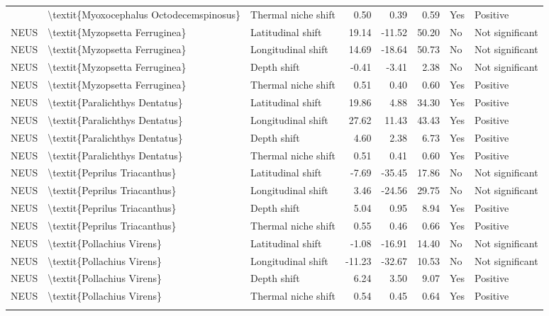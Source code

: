 \begin{longtable}[t]{lllrrrll}
{{\addlinespace
NEUS & \textbackslash{}textit\{Myoxocephalus Octodecemspinosus\} & Thermal niche shift & 0.50 & 0.39 & 0.59 & Yes & Positive\\
NEUS & \textbackslash{}textit\{Myzopsetta Ferruginea\} & Latitudinal shift & 19.14 & -11.52 & 50.20 & No & Not significant\\
NEUS & \textbackslash{}textit\{Myzopsetta Ferruginea\} & Longitudinal shift & 14.69 & -18.64 & 50.73 & No & Not significant\\
NEUS & \textbackslash{}textit\{Myzopsetta Ferruginea\} & Depth shift & -0.41 & -3.41 & 2.38 & No & Not significant\\
NEUS & \textbackslash{}textit\{Myzopsetta Ferruginea\} & Thermal niche shift & 0.51 & 0.40 & 0.60 & Yes & Positive\\
\addlinespace
NEUS & \textbackslash{}textit\{Paralichthys Dentatus\} & Latitudinal shift & 19.86 & 4.88 & 34.30 & Yes & Positive\\
NEUS & \textbackslash{}textit\{Paralichthys Dentatus\} & Longitudinal shift & 27.62 & 11.43 & 43.43 & Yes & Positive\\
NEUS & \textbackslash{}textit\{Paralichthys Dentatus\} & Depth shift & 4.60 & 2.38 & 6.73 & Yes & Positive\\
NEUS & \textbackslash{}textit\{Paralichthys Dentatus\} & Thermal niche shift & 0.51 & 0.41 & 0.60 & Yes & Positive\\
NEUS & \textbackslash{}textit\{Peprilus Triacanthus\} & Latitudinal shift & -7.69 & -35.45 & 17.86 & No & Not significant\\
\addlinespace
NEUS & \textbackslash{}textit\{Peprilus Triacanthus\} & Longitudinal shift & 3.46 & -24.56 & 29.75 & No & Not significant\\
NEUS & \textbackslash{}textit\{Peprilus Triacanthus\} & Depth shift & 5.04 & 0.95 & 8.94 & Yes & Positive\\
NEUS & \textbackslash{}textit\{Peprilus Triacanthus\} & Thermal niche shift & 0.55 & 0.46 & 0.66 & Yes & Positive\\
NEUS & \textbackslash{}textit\{Pollachius Virens\} & Latitudinal shift & -1.08 & -16.91 & 14.40 & No & Not significant\\
NEUS & \textbackslash{}textit\{Pollachius Virens\} & Longitudinal shift & -11.23 & -32.67 & 10.53 & No & Not significant\\
\addlinespace
NEUS & \textbackslash{}textit\{Pollachius Virens\} & Depth shift & 6.24 & 3.50 & 9.07 & Yes & Positive\\
NEUS & \textbackslash{}textit\{Pollachius Virens\} & Thermal niche shift & 0.54 & 0.45 & 0.64 & Yes & Positive\\
}}
\end{longtable}
